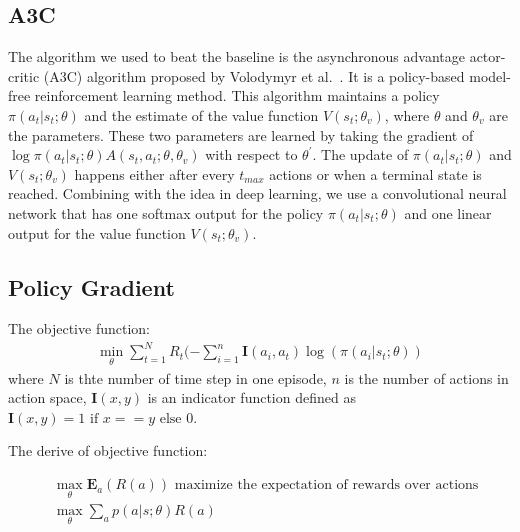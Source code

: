 \subsection{A3C}
The algorithm we used to beat the baseline is the asynchronous advantage actor-critic (A3C) algorithm proposed by Volodymyr et al.~\cite{mnih2016asynchronous}. It is a policy-based model-free reinforcement learning method. This algorithm maintains a policy $\pi (a_{t}|s_{t};\theta)$ and the estimate of the value function $V(s_{t};\theta_{v})$, where $\theta$ and $\theta_{v}$ are the parameters. These two parameters are learned by taking the gradient of $\log \pi (a_{t}|s_{t};\theta) A(s_{t},a_{t};\theta,\theta_{v})$ with respect to $\theta^{\prime}$. The update of $\pi (a_{t}|s_{t};\theta)$ and $V(s_{t};\theta_{v})$ happens either after every $t_{max}$ actions or when a terminal state is reached. Combining with the idea in deep learning, we use a convolutional neural network that has one softmax output for the policy $\pi (a_{t}|s_{t};\theta)$ and one linear output for the value function $V(s_{t};\theta_{v})$.


\subsection{Policy Gradient}
The objective function:
\begin{equation*}
\begin{split}
\min_{\theta}\sum_{t=1}^N R_t (-\sum_{i=1}^{n}\textbf{I}(a_i, a_t)\log(\pi(a_i|s_t; \theta))
\end{split}
\end{equation*}
where $N$ is thte number of time step in one episode, $n$ is the number of actions
in action space, $\textbf{I}(x, y)$ is an indicator function defined as $\textbf{I}(x, y) = 1 \text{ if } x==y \text{ else } 0$.

The derive of objective function:

\begin{equation}
\begin{split}
& \max_{\theta} \textbf{E}_a(R(a)) \text{ maximize the expectation of rewards over actions} \\
& \max_{\theta} \sum_a p(a|s; \theta)R(a)
\end{split}
\end{equation}